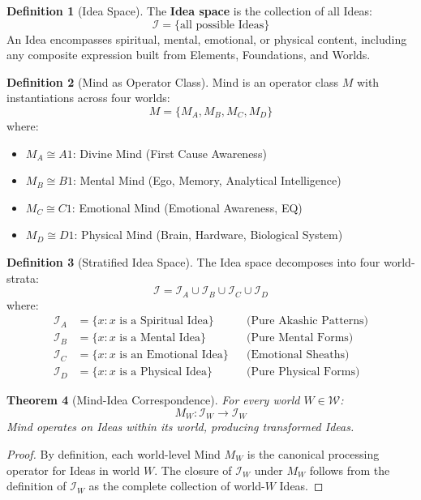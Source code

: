 \documentclass[11pt,twoside,openright]{book}
\theoremstyle{definition}
\newtheorem{definition}{Definition}[chapter]
\theoremstyle{plain}
\newtheorem{theorem}[definition]{Theorem}
\theoremstyle{remark}
\newcommand{\Worlds}{\mathcal{W}}
\newcommand{\Ideas}{\mathcal{I}}
\begin{document}
\begin{definition}[Idea Space]
\label{def:idea-space}
The \textbf{Idea space} is the collection of all Ideas:
\[
\Ideas = \{\text{all possible Ideas}\}
\]
An Idea encompasses spiritual, mental, emotional, or physical content, including any composite expression built from Elements, Foundations, and Worlds.
\end{definition}

\begin{definition}[Mind as Operator Class]
\label{def:mind-class}
Mind is an operator class $M$ with instantiations across four worlds:
\[
M = \{M_A, M_B, M_C, M_D\}
\]
where:
\begin{itemize}
  \item $M_A \cong A1$: Divine Mind (First Cause Awareness)
  \item $M_B \cong B1$: Mental Mind (Ego, Memory, Analytical Intelligence)
  \item $M_C \cong C1$: Emotional Mind (Emotional Awareness, EQ)
  \item $M_D \cong D1$: Physical Mind (Brain, Hardware, Biological System)
\end{itemize}
\end{definition}

\begin{definition}[Stratified Idea Space]
\label{def:stratified-ideas}
The Idea space decomposes into four world-strata:
\[
\Ideas = \Ideas_A \cup \Ideas_B \cup \Ideas_C \cup \Ideas_D
\]
where:
\begin{align}
\Ideas_A &= \{x : x \text{ is a Spiritual Idea}\} && \text{(Pure Akashic Patterns)} \\
\Ideas_B &= \{x : x \text{ is a Mental Idea}\} && \text{(Pure Mental Forms)} \\
\Ideas_C &= \{x : x \text{ is an Emotional Idea}\} && \text{(Emotional Sheaths)} \\
\Ideas_D &= \{x : x \text{ is a Physical Idea}\} && \text{(Pure Physical Forms)}
\end{align}
\end{definition}

\begin{theorem}[Mind-Idea Correspondence]
\label{thm:mind-idea}
For every world $W \in \Worlds$:
\[
M_W : \Ideas_W \to \Ideas_W
\]
Mind operates on Ideas within its world, producing transformed Ideas.
\end{theorem}

\begin{proof}
By definition, each world-level Mind $M_W$ is the canonical processing operator for Ideas in world $W$. The closure of $\Ideas_W$ under $M_W$ follows from the definition of $\Ideas_W$ as the complete collection of world-$W$ Ideas.
\end{proof}
\end{document}
